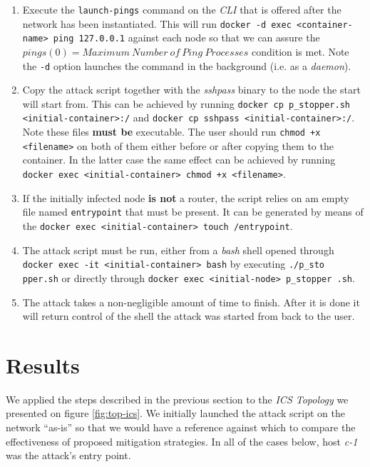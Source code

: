         \begin{enumerate}
            \item Execute the \texttt{launch-pings} command on the \textit{CLI} that is offered after the network has been instantiated. This will run \texttt{docker -d exec <container-name> ping 127.0.0.1} against each node so that we can assure the $pings(0) = Maximum\ Number\ of\ Ping\ Processes$ condition is met. Note the \texttt{-d} option launches the command in the background (i.e. as a \textit{daemon}).
            \item Copy the attack script together with the \textit{sshpass} binary to the node the start will start from. This can be achieved by running \texttt{docker cp p\_stopper.sh <initial-container>:/} and \texttt{docker cp sshpass <initial-container>:/}. Note these files \textbf{must be} executable. The user should run \texttt{chmod +x <filename>} on both of them either before or after copying them to the container. In the latter case the same effect can be achieved by running \texttt{docker exec <initial-container> chmod +x <filename>}.
            \item If the initially infected node \textbf{is not} a router, the script relies on am empty file named \texttt{entrypoint} that must be present. It can be generated by means of the \texttt{docker exec <initial-container> touch /entrypoint}.
            \item The attack script must be run, either from a \textit{bash} shell opened through \texttt{docker exec -it <initial-container> bash} by executing \texttt{./p\_sto pper.sh} or directly through \texttt{docker exec <initial-node> p\_stopper .sh}.
            \item The attack takes a non-negligible amount of time to finish. After it is done it will return control of the shell the attack was started from back to the user.
        \end{enumerate}

    \section{Results}
        We applied the steps described in the previous section to the \textit{ICS Topology} we presented on figure \ref{fig:top-ics}. We initially launched the attack script on the network ``as-is'' so that we would have a reference against which to compare the effectiveness of proposed mitigation strategies. In all of the cases below, host \textit{c-1} was the attack's entry point.\\

